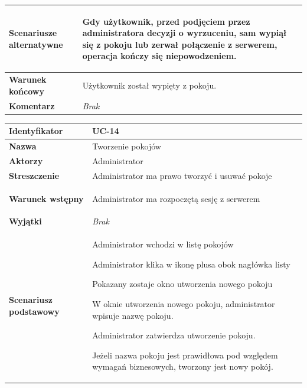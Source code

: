 {\begin{tabular}{ | l | l | }
	\hline
		\textbf{Scenariusze alternatywne} & \parbox[t]
		{11cm}{
			\begin{enumreq}
				\item Gdy użytkownik, przed podjęciem przez administratora decyzji o
				wyrzuceniu, sam wypiął się z pokoju lub zerwał połączenie z serwerem,
				operacja kończy się niepowodzeniem.
			\end{enumreq}
		}
		\\

	\hline
		\textbf{Warunek końcowy} & \parbox[t]{11cm}{
			Użytkownik został wypięty z pokoju.
		}
		\\

	\hline
		\textbf{Komentarz} & \parbox[t]{11cm}{
			\textit{Brak}
		}
		\\

	\hline
\end{tabular}

\vspace{2em}

\begin{tabular}{ | l | l | }
	\hline
		\textbf{Identyfikator} &
		UC-14
		\\

	\hline
		\textbf{Nazwa} &
		Tworzenie pokojów
		\\

	\hline
		\textbf{Aktorzy} & \parbox[t]{11cm}{
			Administrator
		}\\

	\hline
		\textbf{Streszczenie} & \parbox[t]{11cm}{
			Administrator ma prawo tworzyć i usuwać pokoje

		}\\

	\hline
		\textbf{Warunek wstępny} & \parbox[t]{11cm}{
			\begin{enumreq}
				\item Administrator ma rozpoczętą sesję z serwerem
			\end{enumreq}

		}
		\\

	\hline
		\textbf{Wyjątki} & \parbox[t]{11cm}{
			\textit{Brak}

		}
		\\

	\hline
		\textbf{Scenariusz podstawowy} & \parbox[t]{11cm}{
			\begin{enumreq}
				\item Administrator wchodzi w listę pokojów
				\item Administrator klika w ikonę plusa obok nagłówka listy
				\item Pokazany zostaje okno utworzenia nowego pokoju
				\item W oknie utworzenia nowego pokoju, administrator wpisuje nazwę
				pokoju.
				\item Administrator zatwierdza utworzenie pokoju.
				\item Jeżeli nazwa pokoju jest prawidłowa pod względem wymagań
				biznesowych, tworzony jest nowy pokój.
			\end{enumreq}
		}
		\\


\end{tabular}}

